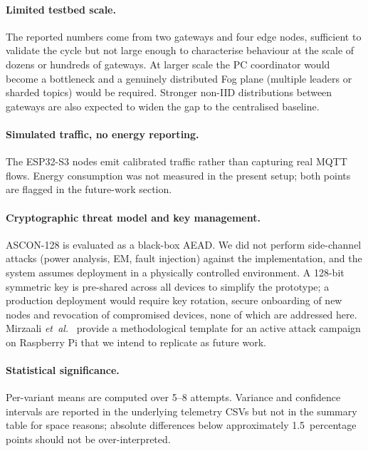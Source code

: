 \documentclass[runningheads]{llncs}
\begin{document}
\paragraph{Limited testbed scale.}
The reported numbers come from two gateways and four edge nodes,
sufficient to validate the cycle but not large enough to characterise
behaviour at the scale of dozens or hundreds of gateways. At larger scale
the PC coordinator would become a bottleneck and a genuinely distributed
Fog plane (multiple leaders or sharded topics) would be required.
Stronger non-IID distributions between gateways are also expected to
widen the gap to the centralised baseline.

\paragraph{Simulated traffic, no energy reporting.}
The ESP32-S3 nodes emit calibrated traffic rather than capturing real
MQTT flows. Energy consumption was not measured in the present setup;
both points are flagged in the future-work section.

\paragraph{Cryptographic threat model and key management.}
ASCON-128 is evaluated as a black-box AEAD. We did not perform side-channel
attacks (power analysis, EM, fault injection) against the implementation,
and the system assumes deployment in a physically controlled environment.
A 128-bit symmetric key is pre-shared across all devices to simplify the
prototype; a production deployment would require key rotation, secure
onboarding of new nodes and revocation of compromised devices, none of
which are addressed here. Mirzaali \textit{et~al.}~\cite{mirzaali2025lwc}
provide a methodological template for an active attack campaign on
Raspberry Pi that we intend to replicate as future work.

\paragraph{Statistical significance.}
Per-variant means are computed over 5--8 attempts. Variance and confidence
intervals are reported in the underlying telemetry CSVs but not in the
summary table for space reasons; absolute differences below approximately
1.5~percentage points should not be over-interpreted.

\end{document}
